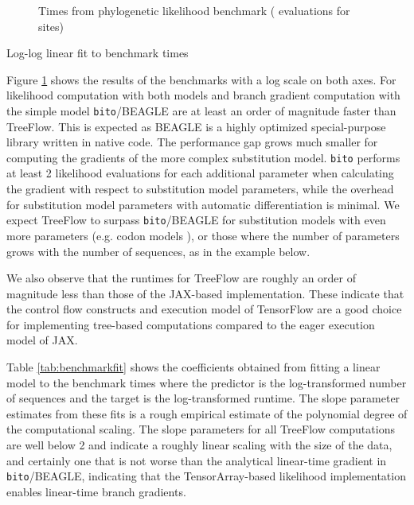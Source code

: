 \begin{figure}
    \centering
    \caption{Times from phylogenetic likelihood benchmark ( evaluations for  sites)}
    \label{fig:benchmark}
\end{figure}

\begin{table}
    \centering
    \caption{Log-log linear fit to benchmark times}
    \label{tab:benchmarkfit}
\end{table}

Figure \ref{fig:benchmark} shows the results of the benchmarks with a log scale on both axes. For likelihood computation with both models and branch gradient computation with the simple model \texttt{bito}/BEAGLE are at least an order of magnitude faster than TreeFlow. This is expected as BEAGLE is a highly optimized special-purpose library written in native code. The performance gap grows much smaller for computing the gradients of the more complex substitution model. \texttt{bito} performs at least 2 likelihood evaluations for each additional parameter when calculating the gradient with respect to substitution model parameters, while the overhead for substitution model parameters with automatic differentiation is minimal. We expect TreeFlow to surpass \texttt{bito}/BEAGLE for substitution models with even more parameters (e.g. codon models \cite{goldman1994codon}), or those where the number of parameters grows with the number of sequences, as in the example below.

We also observe that the runtimes for TreeFlow are roughly an order of magnitude less than those of the JAX-based implementation. These indicate that the control flow constructs and execution model of TensorFlow are a good choice for implementing tree-based computations compared to the eager execution model of JAX.

Table \ref{tab:benchmarkfit} shows the coefficients obtained from fitting a linear model to the benchmark times where the predictor is the log-transformed number of sequences and the target is the log-transformed runtime. The slope parameter estimates from these fits is a rough empirical estimate of the polynomial degree of the computational scaling. The slope parameters for all TreeFlow computations are well below 2 and indicate a roughly linear scaling with the size of the data, and certainly one that is not worse than the analytical linear-time gradient in \texttt{bito}/BEAGLE, indicating that the TensorArray-based likelihood implementation enables linear-time branch gradients.

